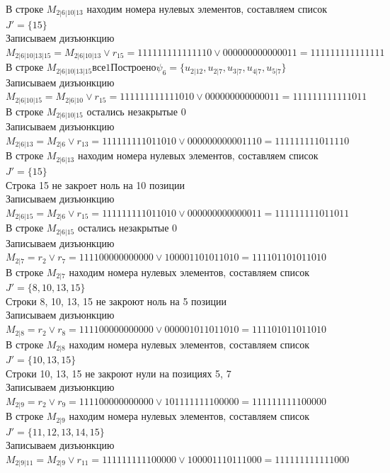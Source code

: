 \documentclass[12pt,a4paper]{report}
\begin{document}
В строке $M_{2 | 6 | 10 | 13}$ находим номера нулевых элементов, составляем список $J' = \{15\}$ \\
Записываем дизъюнкцию $M_{2 | 6 | 10 | 13 | 15} = M_{2 | 6 | 10 | 13}\vee r_{15} = 111111111111110 \vee 000000000000011 = 111111111111111$ \\
В строке $M_{2 | 6 | 10 | 13 | 15} все 1 Построено \psi_{6} = \{u_{2 | 12},u_{2 | 7},u_{3 | 7},u_{4 | 7},u_{5 | 7}\}$ \\
Записываем дизъюнкцию $M_{2 | 6 | 10 | 15} = M_{2 | 6 | 10}\vee r_{15} = 111111111111010 \vee 000000000000011 = 111111111111011$ \\
В строке $M_{2 | 6 | 10 | 15}$ остались незакрытые $0$ \\
Записываем дизъюнкцию $M_{2 | 6 | 13} = M_{2 | 6}\vee r_{13} = 111111111011010 \vee 000000000001110 = 111111111011110$ \\
В строке $M_{2 | 6 | 13}$ находим номера нулевых элементов, составляем список $J' = \{15\}$ \\
Строка 15 не закроет ноль на 10 позиции \\
Записываем дизъюнкцию $M_{2 | 6 | 15} = M_{2 | 6}\vee r_{15} = 111111111011010 \vee 000000000000011 = 111111111011011$ \\
В строке $M_{2 | 6 | 15}$ остались незакрытые $0$ \\
Записываем дизъюнкцию $M_{2 | 7} = r_{2}\vee r_{7} = 111100000000000 \vee 100001101011010 = 111101101011010$ \\
В строке $M_{2 | 7}$ находим номера нулевых элементов, составляем список $J' = \{8, 10, 13, 15\}$ \\
Строки 8, 10, 13, 15 не закроют ноль на 5 позиции \\
Записываем дизъюнкцию $M_{2 | 8} = r_{2}\vee r_{8} = 111100000000000 \vee 000001011011010 = 111101011011010$ \\
В строке $M_{2 | 8}$ находим номера нулевых элементов, составляем список $J' = \{10, 13, 15\}$ \\
Строки 10, 13, 15 не закроют нули на позициях 5, 7 \\
Записываем дизъюнкцию $M_{2 | 9} = r_{2}\vee r_{9} = 111100000000000 \vee 101111111100000 = 111111111100000$ \\
В строке $M_{2 | 9}$ находим номера нулевых элементов, составляем список $J' = \{11, 12, 13, 14, 15\}$ \\
Записываем дизъюнкцию $M_{2 | 9 | 11} = M_{2 | 9}\vee r_{11} = 111111111100000 \vee 100001110111000 = 111111111111000$ \\
\end{document}
